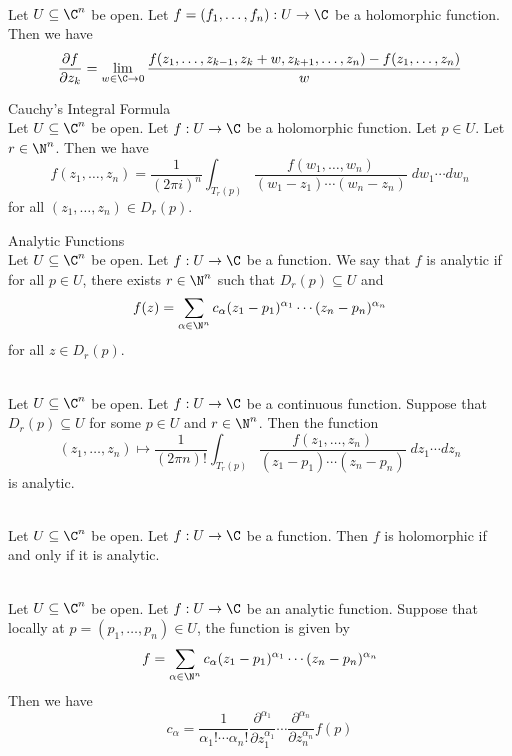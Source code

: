 \documentclass[a4paper]{article}
\begin{document}
\begin{lmm}{}{}\\
Let $U\subseteq\C^n$ be open. Let $f=(f_1,\dots,f_n):U\to\C$ be a holomorphic function. Then we have $$\frac{\partial f}{\partial z_k}=\lim_{w\in\C\to 0}\frac{f(z_1,\dots,z_{k-1},z_k+w,z_{k+1},\dots,z_n)-f(z_1,\dots,z_n)}{w}$$
\end{lmm}

\begin{thm}{Cauchy's Integral Formula}{}\\
Let $U\subseteq\C^n$ be open. Let $f:U\to\C$ be a holomorphic function. Let $p\in U$. Let $r\in\N^n$. Then we have $$f(z_1,\dots,z_n)=\frac{1}{(2\pi i)^n}\int_{T_r(p)}\frac{f(w_1,\dots,w_n)}{(w_1-z_1)\cdots(w_n-z_n)}\;dw_1\cdots dw_n$$ for all $(z_1,\dots,z_n)\in D_r(p)$. 
\end{thm}

\begin{defn}{Analytic Functions}{}\\
Let $U\subseteq\C^n$ be open. Let $f:U\to\C$ be a function. We say that $f$ is analytic if for all $p\in U$, there exists $r\in\N^n$ such that $D_r(p)\subseteq U$ and $$f(z)=\sum_{\alpha\in\N^n}c_\alpha(z_1-p_1)^{\alpha_1}\cdots(z_n-p_n)^{\alpha_n}$$ for all $z\in D_r(p)$. 
\end{defn}

\begin{prp}{}{}\\
Let $U\subseteq\C^n$ be open. Let $f:U\to\C$ be a continuous function. Suppose that $D_r(p)\subseteq U$ for some $p\in U$ and $r\in\N^n$. Then the function $$(z_1,\dots,z_n)\mapsto\frac{1}{(2\pi n)!}\int_{T_r(p)}\frac{f(z_1,\dots,z_n)}{(z_1-p_1)\cdots(z_n-p_n)}\;dz_1\cdots dz_n$$ is analytic. 
\end{prp}

\begin{prp}{}{}\\
Let $U\subseteq\C^n$ be open. Let $f:U\to\C$ be a function. Then $f$ is holomorphic if and only if it is analytic. 
\end{prp}

\begin{prp}{}{}\\
Let $U\subseteq\C^n$ be open. Let $f:U\to\C$ be an analytic function. Suppose that locally at $p=(p_1,\dots,p_n)\in U$, the function is given by $$f=\sum_{\alpha\in\N^n}c_\alpha(z_1-p_1)^{\alpha_1}\cdots(z_n-p_n)^{\alpha_n}$$ Then we have $$c_\alpha=\frac{1}{\alpha_1!\cdots\alpha_n!}\frac{\partial^{\alpha_1}}{\partial z_1^{\alpha_1}}\cdots\frac{\partial^{\alpha_n}}{\partial z_n^{\alpha_n}}f(p)$$
\end{prp}
\end{document}
